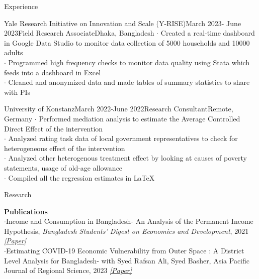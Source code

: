 \documentclass[
	9pt, %
]{resume} %
\begin{document}
\begin{rSection}{Experience}

	\vspace{-15pt}
\begin{rSubsection}{Yale Research Initiative on Innovation and Scale (Y-RISE)}{March 2023- June 2023}{Field Research Associate}{Dhaka, Bangladesh}
		$\cdot$  Created a real-time dashboard in Google Data Studio to monitor data collection of 5000 households and 10000 adults \\
		$\cdot$ Programmed high frequency checks to monitor data quality using Stata which feeds into a dashboard in Excel \\
		$\cdot$ Cleaned and anonymized data and made tables of summary statistics to share with PIs \\
	\end{rSubsection}


\vspace{-15pt}
	\begin{rSubsection}{University of Konstanz}{March 2022-June 2022}{Research Consultant}{Remote, Germany}
		$\cdot$  Performed mediation analysis to estimate the Average Controlled Direct Effect of the intervention \\
		$\cdot$  Analyzed rating task data of local government representatives to check for heterogeneous effect of the intervention \\
		$\cdot$  Analyzed other heterogenous treatment effect by looking at causes of poverty statements, usage of old-age allowance \\
		$\cdot$  Compiled all the regression estimates in \LaTeX
	\end{rSubsection}


	\vspace{-10pt}
\begin{rSection}{Research}

\textbf{{Publications}} \\
$\cdot$Income and Consumption in Bangladesh- An Analysis of the Permanent Income Hypothesis, \textit{Bangladesh Students’ Digest on Economics and Development}, 2021 \textit{\href{https://www.researchgate.net/publication/358138834_Income_and_Consumption_in_Bangladesh-An_Analysis_of_the_Permanent_Income_Hypothesis}{[Paper]}} \\
	$\cdot$Estimating COVID-19 Economic Vulnerability from Outer Space : A District Level Analysis for Bangladesh- with Syed Rafsan Ali, Syed Basher, Asia Pacific Journal of Regional Science, 2023 \textit{\href{https://papers.ssrn.com/sol3/papers.cfm?abstract_id=4589298}{[Paper]}} \\


\end{rSection}
\end{rSection}
\end{document}
